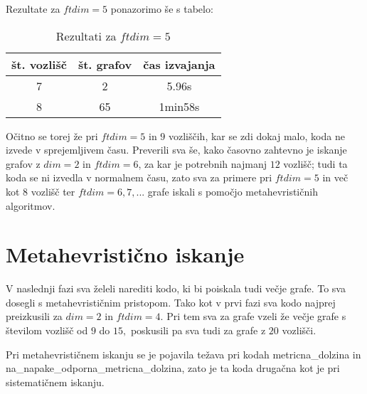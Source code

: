 \documentclass[12pt]{article}
\begin{document}
Rezultate za $ftdim = 5$ ponazorimo še s tabelo:

\begin{table}[H]
	\centering 
 	\begin{tabular}{|c|c|c|} 
 		\hline 
 		\textbf{št. vozlišč} & \textbf{št. grafov} & \textbf{čas izvajanja} \\
 		\hline 7 & 2 & 5.96s  \\ 
 		\hline 8 & 65 & 1min58s \\
 		\hline 
 	\end{tabular} 
 	\caption{Rezultati za $ftdim = 5$}
 	\label{tab:osebe}
\end{table}



Očitno se torej že pri $ftdim = 5$ in $9$ vozliščih, kar se zdi dokaj malo, koda ne izvede v sprejemljivem času. Preverili 
sva še, kako časovno zahtevno je iskanje grafov z $dim = 2$ in $ftdim = 6$, za kar je potrebnih najmanj $12$ vozlišč; tudi 
ta koda se ni izvedla v normalnem času, zato sva za primere pri $ftdim = 5$ in več kot $8$ vozlišč ter $ftdim = 6, 7, ...$ 
grafe iskali s pomočjo metahevrističnih algoritmov. 


\section{Metahevristično iskanje}

V naslednji fazi sva želeli narediti kodo, ki bi poiskala tudi večje grafe. To sva dosegli s metahevrističnim pristopom. Tako
kot v prvi fazi sva kodo najprej preizkusili za $dim = 2$ in $ftdim = 4.$ Pri tem sva za grafe vzeli že večje grafe s številom
vozlišč od $9$ do $15,$ poskusili pa sva tudi za grafe z $20$ vozlišči.
 
Pri metahevrističnem iskanju se je pojavila težava pri kodah metricna\_dolzina in na\_napake\_odporna\_metricna\_dolzina, zato 
je ta koda drugačna kot je pri sistematičnem iskanju. 
\end{document}
